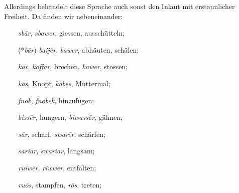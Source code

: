 \largerpage[-1]
Allerdings behandelt diese Sprache auch sonst den Inlaut mit erstaunlicher Freiheit. Da finden wir nebeneinander:

~~~~\textit{sbār}, \textit{sbawer}, giessen, ausschütteln;

~~~~(*\textit{bār}) \textit{baijĕr}, \textit{bawer}, abhäuten, schälen; 

~~~~\textit{kār}, \textit{koffār}, brechen, \textit{kawer}, stossen;

~~~~\textit{kās}, Knopf, \textit{kabes}, Muttermal;

~~~~\textit{fnok}, \textit{fnobek}, hinzufügen;

~~~~\textit{bissēr}, hungern, \textit{biwassēr}, gähnen;

~~~~\textit{sār}, scharf, \textit{swarēr}, schärfen;

~~~~\textit{sariar}, \textit{swariar}, langsam;

~~~~\textit{ruiwēr}, \textit{riwwer}, entfalten;

~~~~\textit{ruōs}, stampfen, \textit{rōs}, treten;

